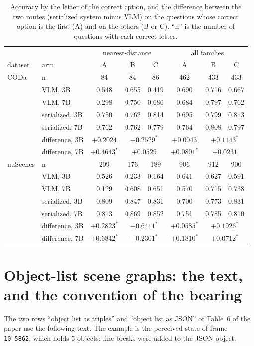 \documentclass[10pt]{article}
\renewcommand{\thetable}{S\arabic{table}}
\newcommand{\fixtab}[1]{\renewcommand{\thetable}{#1}}
\begin{document}
\fixtab{S16c}\begin{table}[h]\centering\footnotesize
\caption{Accuracy by the letter of the correct option, and the difference between the two routes (serialized system minus VLM) on the questions whose correct option is the first (A) and on the others (B or C). ``n'' is the number of questions with each correct letter.}\label{tab:s16c}
\setlength{\tabcolsep}{3.2pt}\begin{tabular}{@{}llcccccc@{}}
\toprule & & \multicolumn{3}{c}{nearest-distance} & \multicolumn{3}{c}{all families} \\
dataset & arm & A & B & C & A & B & C \\ \midrule
CODa & n & 84 & 84 & 86 & 462 & 433 & 433 \\
 & VLM, 3B & 0.548 & 0.655 & 0.419 & 0.690 & 0.716 & 0.667 \\
 & VLM, 7B & 0.298 & 0.750 & 0.686 & 0.684 & 0.797 & 0.762 \\
 & serialized, 3B & 0.750 & 0.762 & 0.814 & 0.695 & 0.799 & 0.813 \\
 & serialized, 7B & 0.762 & 0.762 & 0.779 & 0.764 & 0.808 & 0.797 \\
 & difference, 3B & $+0.2024$ & \multicolumn{2}{c}{$+0.2529^{*}$} & $+0.0043$ & \multicolumn{2}{c}{$+0.1143^{*}$} \\
 & difference, 7B & $+0.4643^{*}$ & \multicolumn{2}{c}{$+0.0529$} & $+0.0801^{*}$ & \multicolumn{2}{c}{$+0.0231$} \\
\midrule
nuScenes & n & 209 & 176 & 189 & 906 & 912 & 900 \\
 & VLM, 3B & 0.526 & 0.233 & 0.164 & 0.641 & 0.627 & 0.591 \\
 & VLM, 7B & 0.129 & 0.608 & 0.651 & 0.570 & 0.715 & 0.738 \\
 & serialized, 3B & 0.809 & 0.847 & 0.831 & 0.700 & 0.773 & 0.831 \\
 & serialized, 7B & 0.813 & 0.869 & 0.852 & 0.751 & 0.785 & 0.810 \\
 & difference, 3B & $+0.2823^{*}$ & \multicolumn{2}{c}{$+0.6411^{*}$} & $+0.0585^{*}$ & \multicolumn{2}{c}{$+0.1926^{*}$} \\
 & difference, 7B & $+0.6842^{*}$ & \multicolumn{2}{c}{$+0.2301^{*}$} & $+0.1810^{*}$ & \multicolumn{2}{c}{$+0.0712^{*}$} \\
\bottomrule
\end{tabular}
\end{table}

\section{Object-list scene graphs: the text, and the convention of the bearing}
The two rows ``object list as triples'' and ``object list as JSON'' of Table~6 of the paper use the following text. The example is the perceived state of frame \texttt{10\_5862}, which holds 5 objects; line breaks were added to the JSON object.
\end{document}
